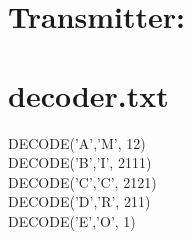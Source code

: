 \documentclass{article}
\begin{document}
\section{Transmitter:}
	\begin{figure}[h!]
	\end{figure}
	\newpage
	\begin{figure}[h!]
	\end{figure}
	\newpage
	\begin{figure}[h!]
	\end{figure}
	\newpage
	\begin{figure}[h!]
	\end{figure}
	\newpage
	\begin{figure}[h!]
	\end{figure}
	\newpage
	\begin{figure}[h!]
	\end{figure}
	\newpage
	\begin{figure}[h!]
	\end{figure}
	\newpage
	\begin{figure}[h!]
	\end{figure}
	\newpage
	\begin{figure}[h!]
	\end{figure}
	\newpage
	\begin{figure}[h!]
	\end{figure}
	\newpage
	
\section{decoder.txt}
DECODE('A','M', 12)\\

DECODE('B','I', 2111)\\

DECODE('C','C', 2121)\\

DECODE('D','R', 211)\\

DECODE('E','O', 1)\\
\end{document}
